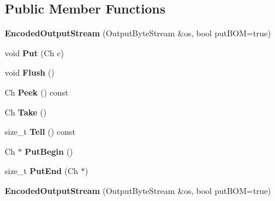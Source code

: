 \subsection*{Public Member Functions}
\begin{DoxyCompactItemize}
\item 
\mbox{\label{classEncodedOutputStream_ad3360c613a30a6a15526ae9ad63bd004}} 
{\bfseries Encoded\+Output\+Stream} (Output\+Byte\+Stream \&os, bool put\+B\+OM=true)
\item 
\mbox{\label{classEncodedOutputStream_a0f3c00f94c195a38d78c05ecda497481}} 
void {\bfseries Put} (Ch c)
\item 
\mbox{\label{classEncodedOutputStream_a657188f6a9f0fae01a4012c288d3fd46}} 
void {\bfseries Flush} ()
\item 
\mbox{\label{classEncodedOutputStream_a22e00087e16ad7a12438fb34fb562bb7}} 
Ch {\bfseries Peek} () const
\item 
\mbox{\label{classEncodedOutputStream_a90f5a5e1598316a417ef5b6ad3d49f36}} 
Ch {\bfseries Take} ()
\item 
\mbox{\label{classEncodedOutputStream_a1c6f6d51999b8d04e4d81d92ff725dbc}} 
size\+\_\+t {\bfseries Tell} () const
\item 
\mbox{\label{classEncodedOutputStream_a78934de4f76c9fa65238e65d3630cbc5}} 
Ch $\ast$ {\bfseries Put\+Begin} ()
\item 
\mbox{\label{classEncodedOutputStream_a818695f6d3fa8896e9d7d0fbdc7d4514}} 
size\+\_\+t {\bfseries Put\+End} (Ch $\ast$)
\item 
\mbox{\label{classEncodedOutputStream_ad3360c613a30a6a15526ae9ad63bd004}} 
{\bfseries Encoded\+Output\+Stream} (Output\+Byte\+Stream \&os, bool put\+B\+OM=true)
\item 
\mbox{\label{classEncodedOutputStream_a0f3c00f94c195a38d78c05ecda497481}} 

\end{DoxyCompactItemize}
